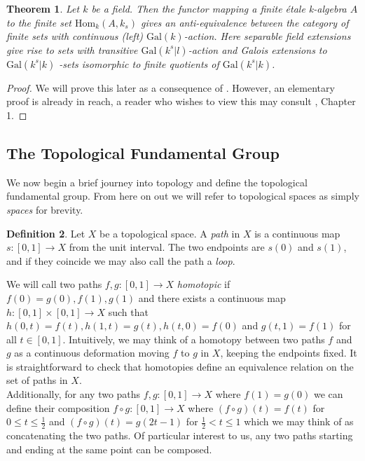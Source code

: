\documentclass{article}
\newtheorem{theorem}{Theorem}[section]
\theoremstyle{definition}
\newtheorem{definition}[theorem]{Definition}
\theoremstyle{remark}
\begin{document}
\begin{theorem}
	Let $k$ be a field. 
	Then the functor mapping a finite \'etale k-algebra $A$ to the finite set $\text{Hom}_k(A, k_s)$ gives an anti-equivalence between the category of finite sets with continuous (left) $\text{Gal}(k)$-action.
	Here separable field extensions give rise to sets with transitive $\text{Gal}(k^s|l)$-action and Galois extensions to $\text{Gal}(k^s|k)$ -sets isomorphic to finite quotients of $\text{Gal}(k^s|k)$.
\end{theorem}

\begin{proof}
	We will prove this later as a consequence of . 
	However, an elementary proof is already in reach, a reader who wishes to view this may consult \cite{Szamuely}, Chapter 1.
\end{proof}

\subsection{The Topological Fundamental Group}
We now begin a brief journey into topology and define the topological fundamental group.
From here on out we will refer to topological spaces as simply \textit{spaces} for brevity.


\begin{definition}
	Let $X$ be a topological space. 
	A \textit{path} in $X$ is a continuous map $s: [0,1] \to X$ from the unit interval.
	The two endpoints are $s(0)$ and $s(1)$, and if they coincide we may also call the path a \textit{loop}.
\end{definition}

We will call two paths $f,g: [0,1] \to X$ \textit{homotopic} if $f(0) = g(0), f(1), g(1)$ and there exists a continuous map $h: [0,1] \times [0,1] \to X$ such that $h(0,t) = f(t), h(1,t) = g(t), h(t,0) = f(0)$ and $g(t,1) = f(1)$ for all $t \in [0,1]$.
Intuitively, we may think of a homotopy between two paths $f$ and $g$ as a continuous deformation moving $f$ to $g$ in $X$, keeping the endpoints fixed. 
It is straightforward to check that homotopies define an equivalence relation on the set of paths in $X$.\\
\indent Additionally, for any two paths $f,g: [0,1] \to X$ where $f(1) = g(0)$ we can define their composition $f \circ g: [0,1] \to X$ where $(f \circ g )(t) = f(t)$ for $0 \leq t \leq \frac{1}{2}$ and $(f \circ g)(t) = g(2t - 1)$ for $ \frac{1}{2} < t \leq 1$ which we may think of as concatenating the two paths.
Of particular interest to us, any two paths starting and ending at the same point can be composed.
\end{document}
